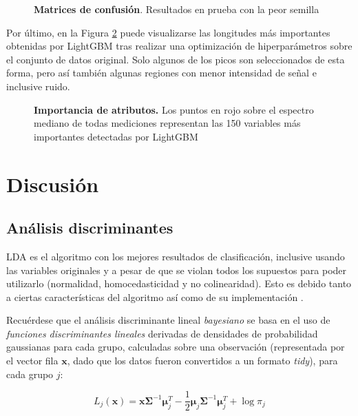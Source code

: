 \documentclass[12pt]{article}
\begin{document}
\begin{figure}[htbp]
\begin{subfigure}[b]{0.35\textwidth}
    \end{subfigure}
    \caption{\textbf{Matrices de confusión}. Resultados en prueba con la peor semilla }  
    \label{fig:classifier}
\end{figure}

Por último, en la Figura \ref{fig:feature_importance} puede visualizarse las longitudes más importantes obtenidas por LightGBM tras realizar una optimización de hiperparámetros sobre el conjunto de datos original. Solo algunos de los picos son seleccionados de esta forma, pero así también algunas regiones con menor intensidad de señal e inclusive ruido.

\begin{figure}[htbp]
    \centering
    
    \caption{\textbf{Importancia de atributos.} Los puntos en rojo sobre el espectro mediano de todas mediciones representan las 150 variables más importantes detectadas por LightGBM}
    \label{fig:feature_importance}
\end{figure}

\section{Discusión}

\subsection{Análisis discriminantes}

LDA es el algoritmo con los mejores resultados de clasificación, inclusive usando las variables originales y a pesar de que se violan todos los supuestos para poder utilizarlo (normalidad, homocedasticidad y no colinearidad). Esto es debido tanto a ciertas características del algoritmo así como de su implementación \cite{DA}.

Recuérdese que el análisis discriminante lineal \textit{bayesiano} se basa en el uso de \textit{funciones discriminantes lineales} derivadas de densidades de probabilidad gaussianas para cada grupo, calculadas sobre una observación (representada por el vector fila $\mathbf{x}$, dado que los datos fueron convertidos a un formato \textit{tidy}), para cada grupo $j$:

\begin{equation} \label{eq:lineal_discriminant}
L_j (\mathbf{x}) = \mathbf{x} \boldsymbol{\Sigma}^{-1} \boldsymbol{\mu}_j^T - \frac{1}{2} \boldsymbol{\mu}_j \boldsymbol{\Sigma}^{-1} \boldsymbol{\mu}_j^T + \log \pi_j
\end{equation}
\end{document}
